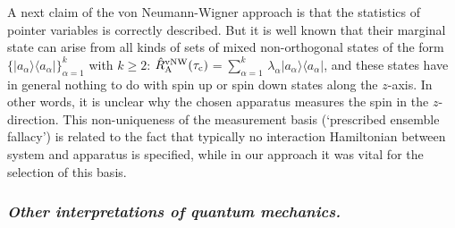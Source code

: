 \documentclass[aps,prb,floatfix,twocolumn]{revtex4}
\newcommand{\tauc}{{\tau_{\rm c}}}
\newcommand{\RA}{{\rm A}}
\newcommand{\down}{{\downarrow}}
\newcommand{\up}{{\uparrow}}
\newcommand{\tf}{t_{\rm f}}
\begin{document}






A next claim of the   von Neumann-Wigner approach is that the statistics of pointer 
variables is correctly described. But it is well known that their marginal state 
can arise from all kinds of  sets of mixed non-orthogonal states of the form 
$\{|a_\alpha\rangle\langle a_\alpha|\}_{\alpha=1}^k$ with $k\geq 2$:
${\hat R}_\RA^{\rm vNW}(\tauc)$$
=\sum_{\alpha=1}^k\, \lambda_\alpha |a_\alpha\rangle\langle a_\alpha|$, 
and these states have in general nothing to do with spin up or spin down states along the 
$z$-axis. In other words, it is unclear why the chosen apparatus measures the
spin in the $z$-direction. This non-uniqueness of the measurement basis 
(`prescribed ensemble fallacy') is related to the fact that 
typically no interaction Hamiltonian between system and apparatus is
specified, while in our approach it was vital for the selection of this basis.

\subsubsection*{\it Other interpretations of quantum mechanics.}
\end{document}
